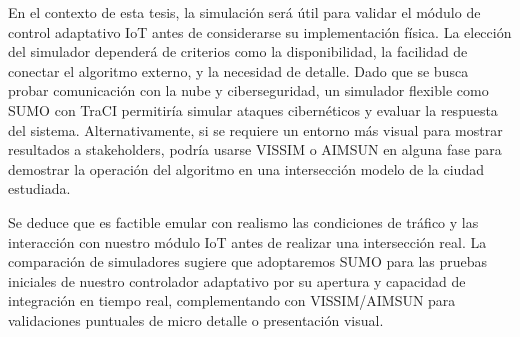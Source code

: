 \documentclass[12pt,a4paper,oneside]{report}
\begin{document}
En el contexto de esta tesis, la simulación será útil para validar el módulo de control adaptativo IoT antes de considerarse su implementación física. La elección del simulador dependerá de criterios como la disponibilidad, la facilidad de conectar el algoritmo externo, y la necesidad de detalle. Dado que se busca probar comunicación con la nube y ciberseguridad, un simulador flexible como SUMO con TraCI permitiría simular ataques cibernéticos y evaluar la respuesta del sistema. Alternativamente, si se requiere un entorno más visual para mostrar resultados a stakeholders, podría usarse VISSIM o AIMSUN en alguna fase para demostrar la operación del algoritmo en una intersección modelo de la ciudad estudiada.

Se deduce que es factible emular con realismo las condiciones de tráfico y las interacción con nuestro módulo IoT antes de realizar una intersección real. La comparación de simuladores sugiere que adoptaremos SUMO para las pruebas iniciales de nuestro controlador adaptativo por su apertura y capacidad de integración en tiempo real, complementando con VISSIM/AIMSUN para validaciones puntuales de micro detalle o presentación visual.

\label{tbl:2.7}
\end{document}

